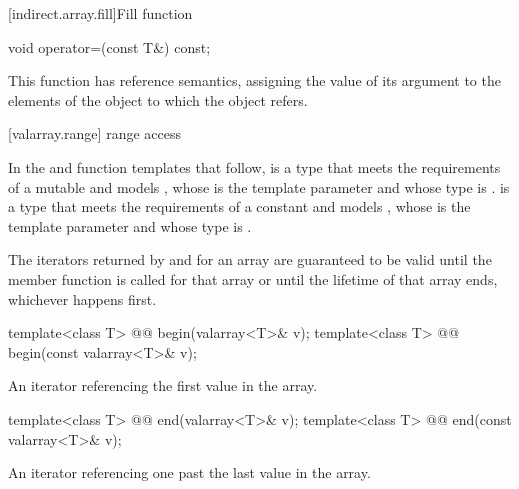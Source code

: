 [indirect.array.fill]{Fill function}

%
\begin{itemdecl}
void operator=(const T&) const;
\end{itemdecl}

\begin{itemdescr}
\pnum
This function has reference semantics, assigning the value of its argument
to the elements of the
object to which the
object refers.
\end{itemdescr}

[valarray.range]{ range access}

\pnum
In the  and  function templates that follow, 
is a type that meets the requirements of a mutable
and models ,
whose  is the template
parameter  and whose  type is .  is a
type that meets the requirements of a constant
and models ,
whose  is the template
parameter  and whose  type is .

\pnum
The iterators returned by  and  for an array
are guaranteed to be valid until the member function
 is called for that
array or until the lifetime of that array ends, whichever happens
first.

%
\begin{itemdecl}
template<class T> @@ begin(valarray<T>& v);
template<class T> @@ begin(const valarray<T>& v);
\end{itemdecl}

\begin{itemdescr}
\pnum
\returns
An iterator referencing the first value in the array.
\end{itemdescr}

%
\begin{itemdecl}
template<class T> @@ end(valarray<T>& v);
template<class T> @@ end(const valarray<T>& v);
\end{itemdecl}

\begin{itemdescr}
\pnum
\returns
An iterator referencing one past the last value in the array.
\end{itemdescr}

